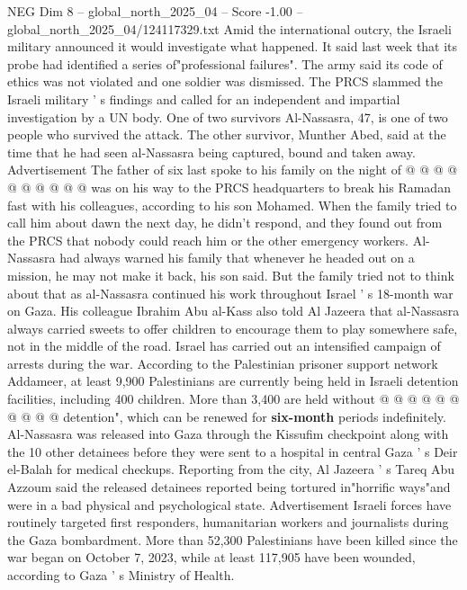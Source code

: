 \begin{textsample}{NEG Dim 8 – global\_north\_2025\_04 – Score -1.00 – global\_north\_2025\_04/124117329.txt}
Amid the international outcry, the Israeli military announced it would investigate what happened.
It said last week that its probe had identified a series of"professional failures".
The army said its code of ethics was not violated and one soldier was dismissed.
The PRCS slammed the Israeli military ' s findings and called for an independent and impartial investigation by a UN body.
One of two survivors Al-Nassasra, 47, is one of two people who survived the attack.
The other survivor, Munther Abed, said at the time that he had seen al-Nassasra being captured, bound and taken away.
Advertisement The father of six last spoke to his family on the night of @ @ @ @ @ @ @ @ @ @ was on his way to the PRCS headquarters to break his Ramadan fast with his colleagues, according to his son Mohamed.
When the family tried to call him about dawn the next day, he didn't respond, and they found out from the PRCS that nobody could reach him or the other emergency workers.
Al-Nassasra had always warned his family that whenever he headed out on a mission, he may not make it back, his son said.
But the family tried not to think about that as al-Nassasra continued his work throughout Israel ' s 18-month war on Gaza.
His colleague Ibrahim Abu al-Kass also told Al Jazeera that al-Nassasra always carried sweets to offer children to encourage them to play somewhere safe, not in the middle of the road.
Israel has carried out an intensified campaign of arrests during the war.
According to the Palestinian prisoner support network Addameer, at least 9,900 Palestinians are currently being held in Israeli detention facilities, including 400 children.
More than 3,400 are held without @ @ @ @ @ @ @ @ @ @ detention", which can be renewed for \textbf{six-month} periods indefinitely.
Al-Nassasra was released into Gaza through the Kissufim checkpoint along with the 10 other detainees before they were sent to a hospital in central Gaza ' s Deir el-Balah for medical checkups.
Reporting from the city, Al Jazeera ' s Tareq Abu Azzoum said the released detainees reported being tortured in"horrific ways"and were in a bad physical and psychological state.
Advertisement Israeli forces have routinely targeted first responders, humanitarian workers and journalists during the Gaza bombardment.
More than 52,300 Palestinians have been killed since the war began on October 7, 2023, while at least 117,905 have been wounded, according to Gaza ' s Ministry of Health.

\end{textsample}
